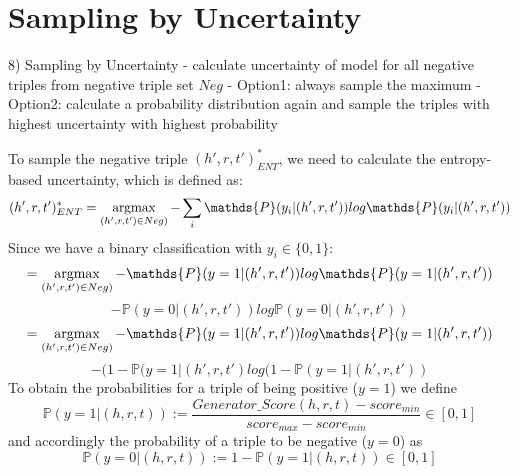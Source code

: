 \section{Sampling by Uncertainty} 
\label{sec:sampling_by_uncertainty}

8) Sampling by Uncertainty
- calculate uncertainty of model for all negative triples from negative triple set $Neg$
- Option1: always sample the maximum
- Option2: calculate a probability distribution again and sample the triples with highest uncertainty with highest probability



To sample the negative triple $(h',r,t')^{*}_{ENT}$, we need to calculate the entropy-based uncertainty, which is defined as: 
$$(h',r,t')^{*}_{ENT} = \argmax_{(h',r,t') \in Neg)} -  \sum_{i}{\mathds{P}(y_i | (h',r,t')) log \mathds{P}(y_i|(h',r,t'))}$$
Since we have a binary classification with $y_i \in \{0,1\}$:\\
$$= \argmax_{(h',r,t') \in Neg)} - \mathds{P}(y = 1| (h',r,t')) log \mathds{P}(y = 1|(h',r,t'))$$
$$- \mathds{P}(y = 0| (h',r,t')) log \mathds{P}(y = 0|(h',r,t'))$$
$$= \argmax_{(h',r,t') \in Neg)} - \mathds{P}(y = 1| (h',r,t')) log \mathds{P}(y = 1|(h',r,t'))$$
$$- (1 - \mathds{P}(y = 1|(h',r,t') log(1 - \mathds{P}(y = 1|(h',r,t'))$$
To obtain the probabilities for a triple of being positive ($y=1$) we define
\begin{equation}
    \mathds{P}(y = 1|(h, r, t)) := \frac{Generator\_Score(h, r, t) - score_{min}}{score_{max} - score_{min}} \in [0, 1]
\end{equation}
and accordingly the probability of a triple to be negative ($y=0$) as
\begin{equation}
    \mathds{P}(y = 0|(h, r, t)) := 1 - \mathds{P}(y = 1|(h, r, t)) \in [0,1]
\end{equation}



